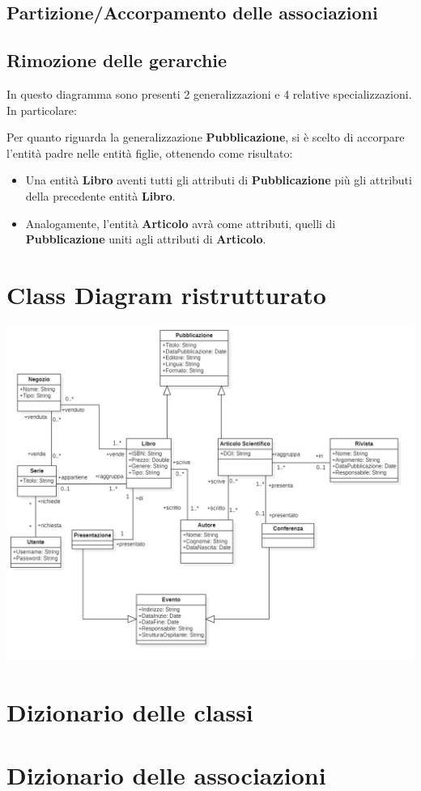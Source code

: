         \subsection{Partizione/Accorpamento delle associazioni}
            
        \subsection{Rimozione delle gerarchie}
            In questo diagramma sono presenti 2 generalizzazioni e 4 relative specializzazioni.
            In particolare:

            Per quanto riguarda la generalizzazione \textbf{Pubblicazione}, si è scelto di accorpare l'entità padre
            nelle entità figlie, ottenendo come risultato:
            \begin{itemize}
                  \item Una entità \textbf{Libro} aventi tutti gli attributi di \textbf{Pubblicazione} più
                        gli attributi della precedente entità \textbf{Libro}.
                  \item Analogamente, l'entità \textbf{Articolo} avrà come attributi, quelli di \textbf{Pubblicazione}
                        uniti agli attributi di \textbf{Articolo}.
            \end{itemize}
    
    \section{Class Diagram ristrutturato}
    \includegraphics[scale=0.25]{Immagini/SchemaConcettuale_v1_2}
        
    \section{Dizionario delle classi}
        
    \section{Dizionario delle associazioni}